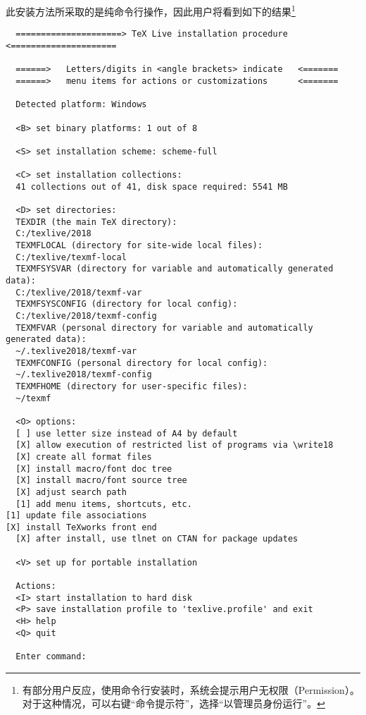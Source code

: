 \documentclass{ctexart}
\begin{document}
此安装方法所采取的是纯命令行操作，因此用户将看到如下的结果\footnote{有部分用户反应，使用命令行安装时，系统会提示用户无权限（Permission）。
  对于这种情况，可以右键“命令提示符”，选择“以管理员身份运行”。}
\begin{lstlisting}
  =====================> TeX Live installation procedure <=====================
  
  ======>   Letters/digits in <angle brackets> indicate   <=======
  ======>   menu items for actions or customizations      <=======
  
  Detected platform: Windows
  
  <B> set binary platforms: 1 out of 8
  
  <S> set installation scheme: scheme-full
  
  <C> set installation collections:
  41 collections out of 41, disk space required: 5541 MB
  
  <D> set directories:
  TEXDIR (the main TeX directory):
  C:/texlive/2018
  TEXMFLOCAL (directory for site-wide local files):
  C:/texlive/texmf-local
  TEXMFSYSVAR (directory for variable and automatically generated data):
  C:/texlive/2018/texmf-var
  TEXMFSYSCONFIG (directory for local config):
  C:/texlive/2018/texmf-config
  TEXMFVAR (personal directory for variable and automatically generated data):
  ~/.texlive2018/texmf-var
  TEXMFCONFIG (personal directory for local config):
  ~/.texlive2018/texmf-config
  TEXMFHOME (directory for user-specific files):
  ~/texmf
  
  <O> options:
  [ ] use letter size instead of A4 by default
  [X] allow execution of restricted list of programs via \write18
  [X] create all format files
  [X] install macro/font doc tree
  [X] install macro/font source tree
  [X] adjust search path
  [1] add menu items, shortcuts, etc.                                                                                                                                                                                                          [1] update file associations                                                                                                                                                                                                                 [X] install TeXworks front end
  [X] after install, use tlnet on CTAN for package updates
  
  <V> set up for portable installation
  
  Actions:
  <I> start installation to hard disk
  <P> save installation profile to 'texlive.profile' and exit
  <H> help
  <Q> quit
  
  Enter command:
\end{lstlisting}
\end{document}
